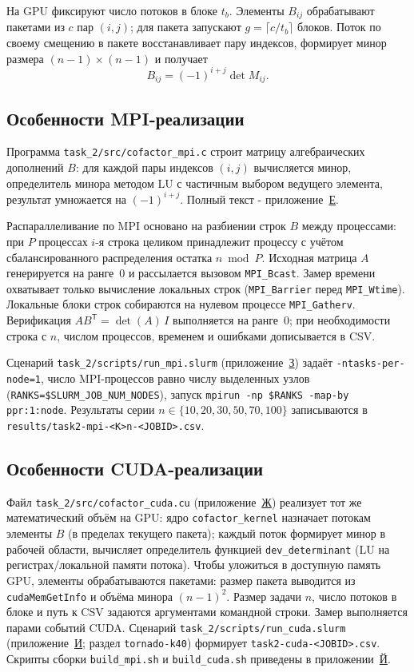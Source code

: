 \documentclass[areasetadvanced]{scrartcl}
\newcommand{\appref}[2]{\hyperref[#1]{#2}}
\begin{document}
На GPU фиксируют число потоков в блоке $t_b$. Элементы $B_{ij}$ обрабатывают пакетами из $c$ пар $(i,j)$; для пакета запускают $g = \lceil c / t_b \rceil$ блоков. Поток по своему смещению в пакете восстанавливает пару индексов, формирует минор размера $(n-1)\times(n-1)$ и получает
\begin{equation}
    B_{ij} = (-1)^{i+j} \det M_{ij}.
\end{equation}

\subsection{Особенности MPI-реализации}

Программа \texttt{task\_2/src/cofactor\_mpi.c} строит матрицу алгебраических дополнений $B$: для каждой пары индексов $(i,j)$ вычисляется минор, определитель минора методом LU с частичным выбором ведущего элемента, результат умножается на $(-1)^{i+j}$. Полный текст - приложение~\appref{app:t2-mpi}{Е}.

Распараллеливание по MPI основано на разбиении строк $B$ между процессами: при $P$ процессах $i$-я строка целиком принадлежит процессу с учётом сбалансированного распределения остатка $n \bmod P$. Исходная матрица $A$ генерируется на ранге~0 и рассылается вызовом \texttt{MPI\_Bcast}. Замер времени охватывает только вычисление локальных строк (\texttt{MPI\_Barrier} перед \texttt{MPI\_Wtime}). Локальные блоки строк собираются на нулевом процессе \texttt{MPI\_Gatherv}. Верификация $A B^{\mathsf T} = \det(A)\, I$ выполняется на ранге~0; при необходимости строка с $n$, числом процессов, временем и ошибками дописывается в CSV.

Сценарий \texttt{task\_2/scripts/run\_mpi.slurm} (приложение~\appref{app:t2-slurm-mpi}{З}) задаёт \texttt{-ntasks-per-node=1}, число MPI-процессов равно числу выделенных узлов (\texttt{RANKS=\$SLURM\_JOB\_NUM\_NODES}), запуск \texttt{mpirun -np \$RANKS -map-by ppr:1:node}. Результаты серии $n\in\{10,20,30,50,70,100\}$ записываются в \texttt{results/task2-mpi-<K>n-<JOBID>.csv}.

\subsection{Особенности CUDA-реализации}

Файл \texttt{task\_2/src/cofactor\_cuda.cu} (приложение~\appref{app:t2-cuda}{Ж}) реализует тот же математический объём на GPU: ядро \texttt{cofactor\_kernel} назначает потокам элементы $B$ (в пределах текущего пакета); каждый поток формирует минор в рабочей области, вычисляет определитель функцией \texttt{dev\_determinant} (LU на регистрах/локальной памяти потока). Чтобы уложиться в доступную память GPU, элементы обрабатываются пакетами: размер пакета выводится из \texttt{cudaMemGetInfo} и объёма минора $(n-1)^2$. Размер задачи $n$, число потоков в блоке и путь к CSV задаются аргументами командной строки. Замер выполняется парами событий CUDA. Сценарий \texttt{task\_2/scripts/run\_cuda.slurm} (приложение~\appref{app:t2-slurm-cuda}{И}; раздел \texttt{tornado-k40}) формирует \texttt{task2-cuda-<JOBID>.csv}. Скрипты сборки \texttt{build\_mpi.sh} и \texttt{build\_cuda.sh} приведены в приложении~\appref{app:t2-build}{Й}.
\end{document}
